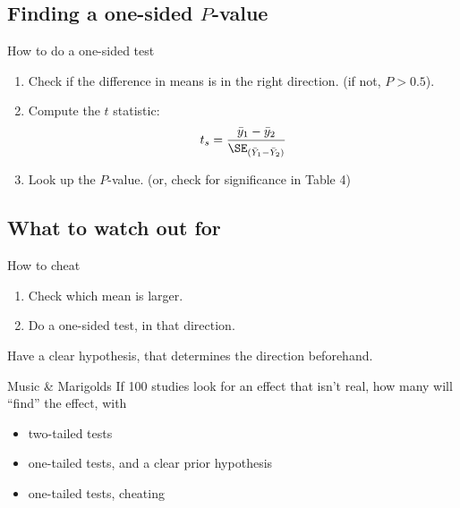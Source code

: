 \subsection{Finding a one-sided $P$-value}

\begin{frame}{How to do a one-sided test}

  \begin{center}
  \end{center}

  \vspace{2em}

  \begin{enumerate}
    \item Check if the difference in means is in the right direction. (if not, $P>0.5$).

    \item Compute the $t$ statistic:
      \[
      t_s = \frac{ \bar y_1 - \bar y_2 }{ \SE_{(\bar Y_1 - \bar Y_2)} }
      \]

    \item Look up the $P$-value. (or, check for significance in Table 4)

  \end{enumerate}


\end{frame}

\subsection{What to watch out for}

%
\begin{frame}{How to cheat}

  \begin{enumerate}
    \item Check which mean is larger.
    \item Do a one-sided test, in that direction.
  \end{enumerate}

  \vspace{2em}

   Have a clear hypothesis, that determines the direction beforehand.

  \vspace{2em}

  \begin{block}{Music \& Marigolds}
    If 100 studies look for an effect that isn't real, 
    how many will ``find'' the effect, with
    \begin{itemize}
      \item[\bf (a)] two-tailed tests
      \item[\bf (b)] one-tailed tests, and a clear prior hypothesis
      \item[\bf (c)] one-tailed tests, cheating
    \end{itemize}
  \end{block}

\end{frame}


